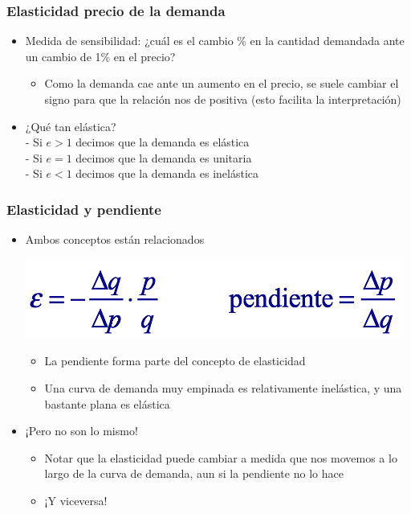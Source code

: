\documentclass{beamer}
\begin{document}
\begin{frame}
\frametitle{ Elasticidad precio de la demanda}
\begin{itemize}
    \item Medida de sensibilidad: ¿cuál es el cambio \% en la cantidad demandada ante un cambio de 1\% en el precio? \\
    \begin{itemize}
        \item Como la demanda cae ante un aumento en el precio, se suele cambiar el signo para que la relación nos de positiva (esto facilita la interpretación)
    \end{itemize}
    \item ¿Qué tan elástica? \\
    - Si $e > 1$ decimos que la demanda es elástica \\
    - Si $e = 1$ decimos que la demanda es unitaria \\
    - Si $e < 1$ decimos que la demanda es inelástica
    \end{itemize}
\end{frame}

\begin{frame}
\frametitle{ Elasticidad y pendiente}
\begin{itemize}
    \item Ambos conceptos están relacionados
    \begin{center}
    \includegraphics[scale=0.5]{Figures/Tema_06.44_elasticidadpendiente.png}
    \end{center}
        \begin{itemize}
        \item La pendiente forma parte del concepto de elasticidad
        \item Una curva de demanda muy empinada es relativamente inelástica, y una bastante plana es elástica
        \end{itemize}
    \item ¡Pero no son lo mismo!
        \begin{itemize}
            \item Notar que la elasticidad puede cambiar a medida que nos movemos a lo largo de la curva de demanda, aun si la pendiente no lo hace
            \item ¡Y viceversa!
        \end{itemize}
    \end{itemize}
\end{frame}
\end{document}
